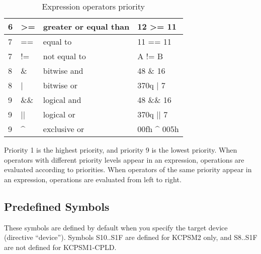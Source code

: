 \begin{table}[h!]
\begin{tabular}{|l|l|l|l|}
                6        & >=       & greater or equal than   & 12 >= 11        \\\hline
                7        & ==       & equal to                & 11 == 11        \\\hline
                7        & !=       & not equal to            &  A != B         \\\hline
                8        & \&       & bitwise and             & 48 \& 16        \\\hline
                8        & |        & bitwise or              & 370q | 7        \\\hline
                9        & \&\&     & logical and             & 48 \&\& 16      \\\hline
                9        & ||       & logical or              & 370q || 7       \\\hline
                9        & \^{}     & exclusive or            & 00fh \^{} 005h  \\\hline
            \end{tabular}

            \caption{Expression operators priority}
        \end{table}

        Priority 1 is the highest priority, and priority 9 is the lowest priority. When operators with different priority levels appear in an expression, operations are evaluated according to priorities. When operators of the same priority appear in an expression, operations are evaluated from left to right.

    \clearpage
    \subsection{Predefined Symbols}
        These symbols are defined by default when you specify the target device (directive ``device''). Symbols S10..S1F are defined for KCPSM2 only, and S8..S1F are not defined for KCPSM1-CPLD.

